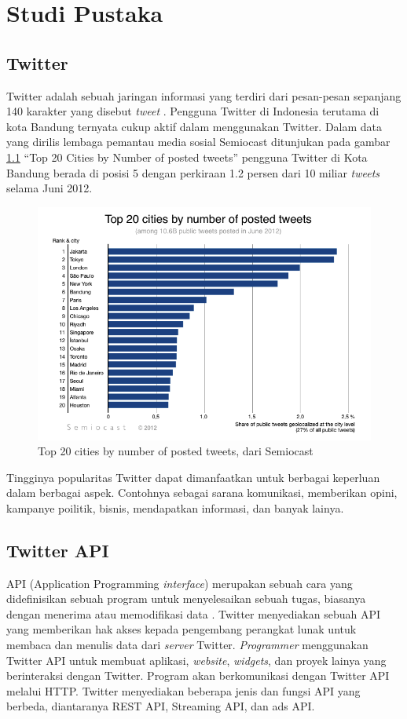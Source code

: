 \chapter{Studi Pustaka}
\section{Twitter}
Twitter adalah sebuah jaringan informasi yang terdiri dari pesan-pesan sepanjang 140 karakter yang disebut \textit{tweet} \cite{TwitterDef:2015}. Pengguna Twitter di Indonesia terutama di kota Bandung ternyata cukup aktif dalam menggunakan Twitter. Dalam data yang dirilis lembaga pemantau media sosial Semiocast ditunjukan pada gambar \ref{fig:num_post_tweet} ``Top 20 Cities by Number of posted tweets'' pengguna Twitter di Kota Bandung berada di posisi 5 dengan perkiraan 1.2 persen dari 10 miliar \textit{tweets} selama Juni 2012.
\begin{figure}
\centering
\includegraphics[width=\linewidth]{Gambar/mine/twittercity}
\caption[Top 20 cities by number of posted tweets, dari Semiocast]{Top 20 cities by number of posted tweets, dari Semiocast} 
\label{fig:num_post_tweet}
\end{figure}
Tingginya popularitas Twitter dapat dimanfaatkan untuk berbagai keperluan dalam berbagai aspek. Contohnya sebagai sarana komunikasi, memberikan opini, kampanye poilitik, bisnis, mendapatkan informasi, dan banyak lainya.
\section{Twitter API}
API (Application Programming \textit{interface}) merupakan sebuah cara yang didefinisikan sebuah program untuk menyelesaikan sebuah tugas, biasanya dengan menerima atau memodifikasi data \cite{TwitterApi:2015}. Twitter menyediakan sebuah API yang memberikan hak akses kepada pengembang perangkat lunak untuk membaca dan menulis data dari \textit{server}  Twitter. \textit{Programmer} menggunakan Twitter API untuk membuat aplikasi, \textit{website}, \textit{widgets}, dan proyek lainya yang berinteraksi dengan Twitter. Program akan berkomunikasi dengan Twitter API melalui HTTP. Twitter menyediakan beberapa jenis dan fungsi API yang berbeda, diantaranya REST API, Streaming API, dan ads API.

